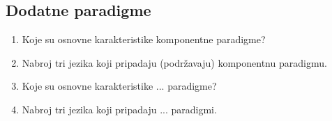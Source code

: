 \documentclass[main.tex]{subfiles}
\begin{document}
\begin{multicols}{2}
\begin{enumerate}
\end{enumerate}

\subsection{Dodatne paradigme}
\begin{enumerate}
\item Koje su osnovne karakteristike komponentne paradigme?
\item Nabroj tri jezika koji pripadaju (podržavaju) komponentnu paradigmu.
\item Koje su osnovne karakteristike ... paradigme?
\item Nabroj tri jezika koji pripadaju ... paradigmi.

\end{enumerate}


\end{multicols}
\end{document}
